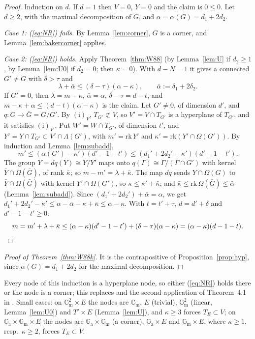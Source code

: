 \documentclass[11pt]{amsart}
\theoremstyle{definition}
\newcommand{\Ga}{\mathbb{G}_{\mathrm a}}
\newcommand{\Gm}{\mathbb{G}_{\mathrm m}}
\begin{document}
\begin{proof}
Induction on $d$. If $d=1$ then $V=0$, $Y=0$ and the claim is $0\le0$. Let $d\ge2$, with the maximal decomposition of $G$,
and $\alpha=\alpha(G)=d_1+2d_2$.

\emph{Case 1: (\ref{eq:NR}) fails.} By Lemma~\ref{lem:corner}, $G$ is a corner, and Lemma~\ref{lem:bakercorner} applies.

\emph{Case 2: (\ref{eq:NR}) holds.} Apply Theorem~\ref{thm:W88} (by Lemma~\ref{lem:U} if $d_2\ge1$, by Lemma~\ref{lem:U0}
if $d_2=0$; then $\kappa=0$). With $d-N=1$ it gives a connected $G'\ne G$ with $\delta>\tau$ and
\[
\lambda+\bar\alpha\le(\delta-\tau)(\alpha-\kappa),\qquad\bar\alpha:=\delta_1+2\delta_2 .
\]
If $G'=0$, then $\lambda=m-\kappa$, $\bar\alpha=\alpha$, $\delta-\tau=d-t$, and $m-\kappa+\alpha\le(d-t)(\alpha-\kappa)$ is
the claim. Let $G'\ne0$, of dimension $d'$, and $q\colon G\to\bar G=G/G'$. By $(\mathrm i)_V$, $T_{G'}\not\subset V$, so
$V'=V\cap T_{G'}$ is a hyperplane of $T_{G'}$, and it satisfies $(\mathrm i)_{V'}$. Put $W'=W\cap T_{G'}$, of dimension $t'$,
and $Y'=Y\cap T_{G'}\subset V'\cap\Lambda(G')$, with $m'=\mathrm{rk}\,Y'$ and $\kappa'=\mathrm{rk}(Y'\cap\Omega(G'))$. By
induction and Lemma~\ref{lem:subadd},
\[
m'\le(\alpha(G')-\kappa')(d'-1-t')\le(d_1'+2d_2'-\kappa')(d'-1-t').
\]
The group $\bar Y=dq(Y)\cong Y/Y'$ maps onto $q(\Gamma)\cong\Gamma/(\Gamma\cap G')$ with kernel $\bar Y\cap\Omega(\bar G)$, of
rank $\bar\kappa$; so $m-m'=\lambda+\bar\kappa$. The map $dq$ sends $Y\cap\Omega(G)$ to $\bar Y\cap\Omega(\bar G)$ with kernel
$Y'\cap\Omega(G')$, so $\kappa\le\kappa'+\bar\kappa$; and $\bar\kappa\le\mathrm{rk}\,\Omega(\bar G)\le\bar\alpha$
(Lemma~\ref{lem:subadd}). Since $(d_1'+2d_2')+\bar\alpha=\alpha$, we get
$d_1'+2d_2'-\kappa'\le\alpha-\bar\alpha-\kappa+\bar\kappa\le\alpha-\kappa$. With $t=t'+\tau$, $d=d'+\delta$ and
$d'-1-t'\ge0$:
\[
m=m'+\lambda+\bar\kappa\le(\alpha-\kappa)(d'-1-t')+(\delta-\tau)(\alpha-\kappa)=(\alpha-\kappa)(d-1-t).\qedhere
\]
\end{proof}

\begin{proof}[Proof of Theorem~\ref{thm:W88k}]
It is the contrapositive of Proposition~\ref{prop:hyp}, since $\alpha(G)=d_1+2d_2$ for the maximal decomposition.
\end{proof}

\noindent Every node of this induction is a hyperplane node, so either (\ref{eq:NR}) holds there or the node is a corner;
this replaces \cite[Lemmas~5.1, 5.2]{W88} and the second application of Theorem~4.1 in \cite[\S5d]{W88}. Small cases: on
$\Gm^2\times E$ the nodes are $\Gm$, $E$ (trivial), $\Gm^2$ (linear, Lemma~\ref{lem:U0}) and $T'\times E$
(Lemma~\ref{lem:U}), and $\kappa\ge3$ forces $T_E\subset V$; on $\Ga\times\Gm\times E$ the nodes are $\Ga\times\Gm$ (a corner),
$\Ga\times E$ and $\Gm\times E$, where $\kappa\ge1$, resp.\ $\kappa\ge2$, forces $T_E\subset V$.
\end{document}
